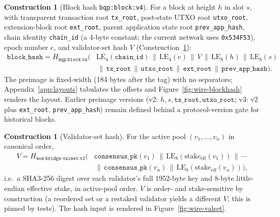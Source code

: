 \documentclass[11pt]{article}
\newcommand{\code}[1]{\texttt{#1}}
\newcommand{\sha}{SHA3\mbox{-}256}
\newcommand{\LE}[1]{\mathrm{LE}_{#1}}
\newcommand{\concat}{\,\|\,}
\theoremstyle{plain}
\theoremstyle{definition}
\newtheorem{construction}[theorem]{Construction}
\theoremstyle{remark}
\begin{document}
\begin{construction}[Block hash \code{bqp:block:v4}]
\label{con:blockhash}
For a block at height $h$ in slot $s$, with transparent transaction root
\code{tx\_root}, post-state UTXO root \code{utxo\_root}, extension-block root
\code{ext\_root}, parent application state root \code{prev\_app\_hash}, chain
identity \code{chain\_id} (a 4-byte constant; the current network uses
\code{0x534F53}), epoch number $e$, and validator-set hash $V$
(Construction~\ref{con:valsethash}):
\[
\begin{aligned}
\code{block\_hash} = H_{\code{bqp:block:v4}}\big(
  &\LE{4}(\code{chain\_id}) \concat \LE{4}(e) \concat V \concat \LE{8}(h) \concat \LE{8}(s) \\
  &\concat \code{tx\_root} \concat \code{utxo\_root} \concat \code{ext\_root} \concat \code{prev\_app\_hash}\big).
\end{aligned}
\]
The preimage is fixed-width (184 bytes after the tag) with no separators;
Appendix~\ref{app:layouts} tabulates the offsets and
Figure~\ref{fig:wire-blockhash} renders the layout. Earlier preimage versions
(v2: $h, s, \code{tx\_root}, \code{utxo\_root}$; v3: v2 plus
\code{ext\_root}, \code{prev\_app\_hash}) remain defined behind a
protocol-version gate for historical blocks.
\end{construction}

\begin{construction}[Validator-set hash]
\label{con:valsethash}
For the active pool $(v_1, \dots, v_n)$ in canonical order,
\[
\begin{aligned}
V = H_{\code{sos:bridge-valset:v2}}\big(
  &\code{consensus\_pk}(v_1) \concat \LE{8}(\mathrm{stake}_{\mathrm{eff}}(v_1)) \concat \cdots \\
  &\concat \code{consensus\_pk}(v_n) \concat \LE{8}(\mathrm{stake}_{\mathrm{eff}}(v_n))\big),
\end{aligned}
\]
i.e.\ a \sha{} digest over each validator's full 1952-byte key and 8-byte
little-endian effective stake, in active-pool order. $V$ is order- and
stake-sensitive by construction (a reordered set or a restaked validator
yields a different $V$; this is pinned by tests). The hash input is rendered
in Figure~\ref{fig:wire-valset}.
\end{construction}
\end{document}

